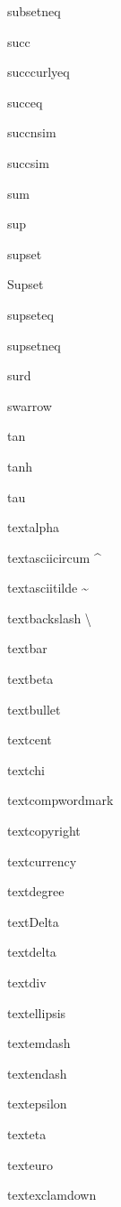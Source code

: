 \documentclass{article}
\begin{document}
subsetneq    \subsetneq{}

succ    \succ{}

succcurlyeq    \succcurlyeq{}

succeq    \succeq{}

succnsim    \succnsim{}

succsim    \succsim{}

sum    \sum{}

sup    \sup{}

supset    \supset{}

Supset    \Supset{}

supseteq    \supseteq{}

supsetneq    \supsetneq{}

surd    \surd{}

swarrow    \swarrow{}


tan    \tan{}

tanh    \tanh{}

tau    \tau{}

textalpha    \textalpha{}

textasciicircum    \textasciicircum{}

textasciitilde    \textasciitilde{}

textbackslash    \textbackslash{}

textbar    \textbar{}

textbeta    \textbeta{}

textbullet    \textbullet{}

textcent    \textcent{}

textchi    \textchi{}

textcompwordmark    \textcompwordmark{}

textcopyright    \textcopyright{}

textcurrency    \textcurrency{}

textdegree    \textdegree{}

textDelta    \textDelta{}

textdelta    \textdelta{}

textdiv    \textdiv{}

textellipsis    \textellipsis{}

textemdash    \textemdash{}

textendash    \textendash{}

textepsilon    \textepsilon{}

texteta    \texteta{}

texteuro    \texteuro{}

textexclamdown    \textexclamdown{}
\end{document}
